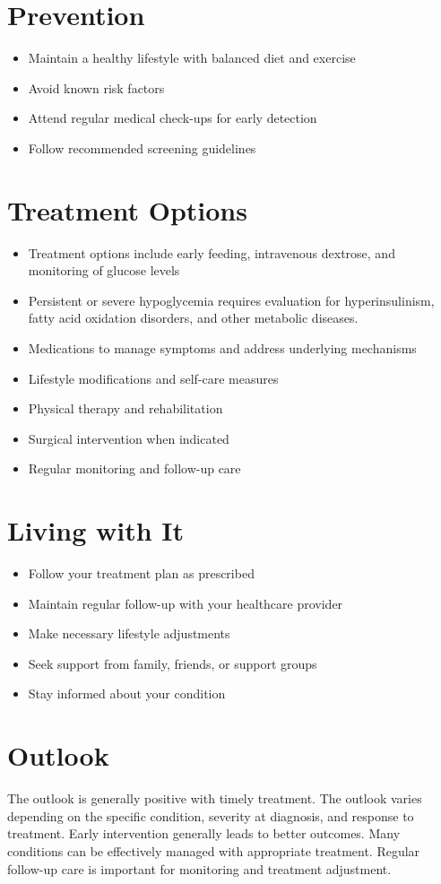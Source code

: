 \section{Prevention}
\begin{itemize}[noitemsep]
  \item Maintain a healthy lifestyle with balanced diet and exercise
  \item Avoid known risk factors
  \item Attend regular medical check-ups for early detection
  \item Follow recommended screening guidelines
\end{itemize}
\section{Treatment Options}
\begin{itemize}[noitemsep]
  \item Treatment options include early feeding, intravenous dextrose, and monitoring of glucose levels
  \item Persistent or severe hypoglycemia requires evaluation for hyperinsulinism, fatty acid oxidation disorders, and other metabolic diseases.
  \item Medications to manage symptoms and address underlying mechanisms
  \item Lifestyle modifications and self-care measures
  \item Physical therapy and rehabilitation
  \item Surgical intervention when indicated
  \item Regular monitoring and follow-up care
\end{itemize}
\section{Living with It}
\begin{itemize}[noitemsep]
  \item Follow your treatment plan as prescribed
  \item Maintain regular follow-up with your healthcare provider
  \item Make necessary lifestyle adjustments
  \item Seek support from family, friends, or support groups
  \item Stay informed about your condition
\end{itemize}
\section{Outlook}
The outlook is generally positive with timely treatment. The outlook varies depending on the specific condition, severity at diagnosis, and response to treatment. Early intervention generally leads to better outcomes. Many conditions can be effectively managed with appropriate treatment. Regular follow-up care is important for monitoring and treatment adjustment.
